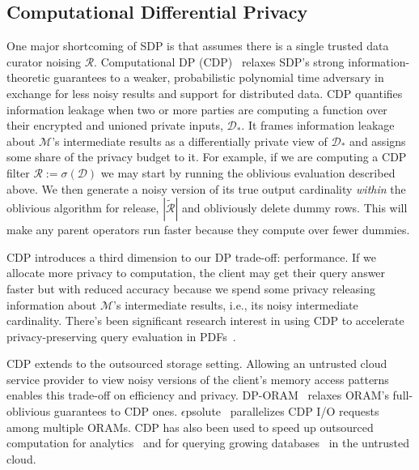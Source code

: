 \documentclass[11pt]{article}
\newcommand{\mechanism}{$\mathcal{M}$\xspace}
\newcommand{\answer}{$\mathcal{R}$\xspace}
\newcommand{\cut}[1]{}
\begin{document}
\subsection{Computational Differential Privacy} One major shortcoming of SDP is that assumes there is a single trusted data curator noising \answer.   \cut{It is attractive because its guarantees are information-theoretic.}  Computational DP (CDP)~\cite{beimel2008distributed, mironov2009computational} relaxes SDP's strong information-theoretic guarantees to a weaker, probabilistic polynomial time adversary in exchange for less noisy results and support for distributed data.   CDP quantifies information leakage when two or more parties are computing a function over their encrypted and unioned private inputs, $\mathcal{D}_*$.    It frames information leakage about \mechanism's intermediate results as a differentially private view of $\mathcal{D}_*$ and assigns some share of the privacy budget to it.    For example, if we are computing a CDP filter $\mathcal{R} := \sigma(\mathcal{D})$ we may start by running the oblivious evaluation described above.   We then generate a noisy version of its true output cardinality {\em within} the oblivious algorithm for release, $|\widetilde{\mathcal{R}}|$ and obliviously delete dummy rows.  This will make any parent operators run faster because they compute over fewer dummies. 

CDP introduces a third dimension to our DP trade-off:  performance.
If we allocate more privacy to computation, the client may get their query answer faster but with reduced accuracy because we spend some privacy releasing information about \mechanism's intermediate results, i.e., its noisy intermediate cardinality.  There's been significant research interest in using CDP to accelerate privacy-preserving query evaluation in PDFs~\cite{bater2018shrinkwrap, bater2020saqe,he2017composing}. 


CDP  extends to the outsourced storage setting.  Allowing an untrusted cloud service provider to view noisy versions of the client's memory access patterns enables this trade-off on efficiency and privacy.   DP-ORAM~\cite{wagh2018differentially} relaxes ORAM's full-oblivious guarantees to CDP ones.    $\epsilon$psolute~\cite{kellaris2017accessing, bogatov2021varepsilonpsolute} parallelizes CDP I/O requests among multiple ORAMs.   CDP has also been used to speed up outsourced computation for analytics~\cite{roy2020cryptepsilon} and for querying growing databases~\cite{zhang2023longshot, wang2022incshrink,wang2021dp} in the untrusted cloud.  
\end{document}
